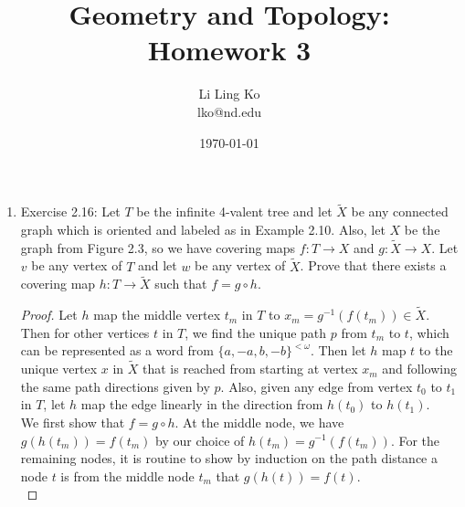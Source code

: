 \documentclass{article}
\begin{document}
\title{Geometry and Topology: Homework 3}
\author{Li Ling Ko\\ lko@nd.edu}
\date{\today}
\maketitle

\begin{enumerate}
  \item Exercise 2.16: Let $T$ be the infinite 4-valent tree and let
    $\tilde{X}$ be any connected graph which is oriented and labeled as in
    Example 2.10. Also, let $X$ be the graph from Figure 2.3, so we have
    covering maps $f:T\rightarrow X$ and $g:\tilde{X}\rightarrow X$. Let
    $v$ be any vertex of $T$ and let $w$ be any vertex of $\tilde{X}$.
    Prove that there exists a covering map $h:T\rightarrow\tilde{X}$ such
    that $f=g\circ h$.

    \begin{proof}
      Let $h$ map the middle vertex $t_m$ in $T$ to
      $x_m=g^{-1}(f(t_m))\in\tilde{X}$. Then for other vertices $t$ in $T$,
      we find the unique path $p$ from $t_m$ to $t$, which can be
      represented as a word from $\{a,-a,b,-b\}^{<\omega}$. Then let $h$
      map $t$ to the unique vertex $x$ in $\tilde{X}$ that is reached from
      starting at vertex $x_m$ and following the same path directions given
      by $p$. Also, given any edge from vertex $t_0$ to $t_1$ in $T$, let
      $h$ map the edge linearly in the direction from $h(t_0)$ to $h(t_1)$.
      \\

      We first show that $f=g\circ h$. At the middle node, we have
      $g(h(t_m))=f(t_m)$ by our choice of $h(t_m)=g^{-1}(f(t_m))$. For the
      remaining nodes, it is routine to show by induction on the path
      distance a node $t$ is from the middle node $t_m$ that
      $g(h(t))=f(t)$. \\
    \end{proof}
\end{enumerate}
\end{document}
